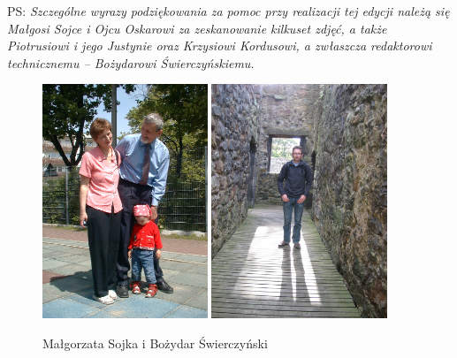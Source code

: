 \clearpage

PS: \textit{Szczególne wyrazy podziękowania za pomoc przy realizacji tej edycji należą się Małgosi Sojce i Ojcu Oskarowi za zeskanowanie kilkuset zdjęć, a także Piotrusiowi i jego Justynie oraz Krzysiowi Kordusowi, a zwłaszcza redaktorowi technicznemu – Bożydarowi Świerczyńskiemu.}

\begin{figure}[!h]
\begin{center}
\includegraphics[height=70mm]{photo/malgorzata_sojka.jpg}
\includegraphics[height=70mm]{photo/bozydar_swierczynski_2.jpg}
\caption{Małgorzata Sojka i Bożydar Świerczyński}
\end{center}
\end{figure}






